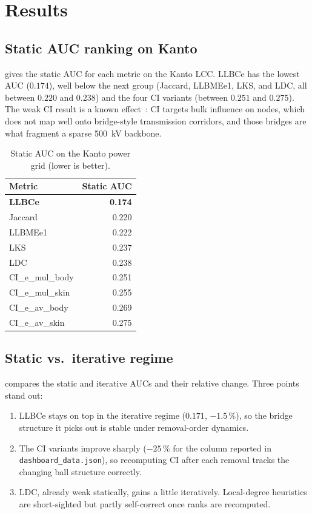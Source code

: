 \documentclass[11pt,a4paper]{article}
\begin{document}
\section{Results}
\label{sec:results}

\subsection{Static AUC ranking on Kanto}
 gives the static AUC for each metric on the Kanto
LCC. LLBCe has the lowest AUC ($0.174$), well below the next group
(Jaccard, LLBMEe1, LKS, and LDC, all between $0.220$ and $0.238$) and the
four CI variants (between $0.251$ and $0.275$). The weak CI result is a
known effect~\cite{kitsak2024edge}: CI targets bulk influence on nodes,
which does not map well onto bridge-style transmission corridors, and
those bridges are what fragment a sparse \SI{500}{\kilo\volt} backbone.

\begin{table}[h]
\centering
\small
\caption{Static AUC on the Kanto power grid (lower is better).}
\label{tab:tokyo-static}
\begin{tabular}{lr}
\toprule
Metric & Static AUC \\
\midrule
\textbf{LLBCe}      & \textbf{0.174} \\
Jaccard             & 0.220 \\
LLBMEe1             & 0.222 \\
LKS                 & 0.237 \\
LDC                 & 0.238 \\
CI\_e\_mul\_body    & 0.251 \\
CI\_e\_mul\_skin    & 0.255 \\
CI\_e\_av\_body     & 0.269 \\
CI\_e\_av\_skin     & 0.275 \\
\bottomrule
\end{tabular}
\end{table}

\subsection{Static vs.\ iterative regime}
 compares the static and iterative AUCs and their
relative change. Three points stand out:
\begin{enumerate}
\item LLBCe stays on top in the iterative regime ($0.171$, $-1.5\,\%$),
so the bridge structure it picks out is stable under removal-order
dynamics.
\item The CI variants improve sharply ($-25\,\%$ for the column reported
in \texttt{dashboard\_\allowbreak data.json}), so recomputing CI after each
removal tracks the changing ball structure correctly.
\item LDC, already weak statically, gains a little iteratively.
Local-degree heuristics are short-sighted but partly self-correct once
ranks are recomputed.
\end{enumerate}
\end{document}
